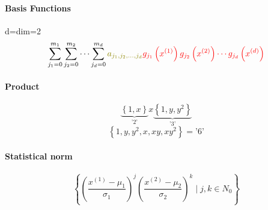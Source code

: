 \paragraph{Basis Functions}
d=dim=2
$$
\sum_{j_1=0}^{m_1} \sum_{j_2=0}^{m_2} \cdots \sum_{j_d=0}^{m_d} \textcolor{olive}{a_{j_1, j_2, \ldots, j_d}} \textcolor{red}{g_{j_1}\left(x^{(1)}\right) g_{j_2}\left(x^{(2)}\right) \cdots g_{j_d}\left(x^{(d)}\right)}
$$
\paragraph{Product}
$$
\underbrace{\left\{1, x\right\}}_{\text{'2'}}x\underbrace{\left\{1, y, y^2\right\}}_{\text{'3'}}
$$
$$
\left\{1, y, y^2,x,xy,xy^2 \right\}=\text{'6'}
$$
\paragraph{Statistical norm}
$$
\left\{\left(\frac{x^{(1)}-\mu_1}{\sigma_1}\right)^j\left(\frac{x^{(2)}-\mu_2}{\sigma_2}\right)^k \mid j, k \in N_0\right\}
$$
